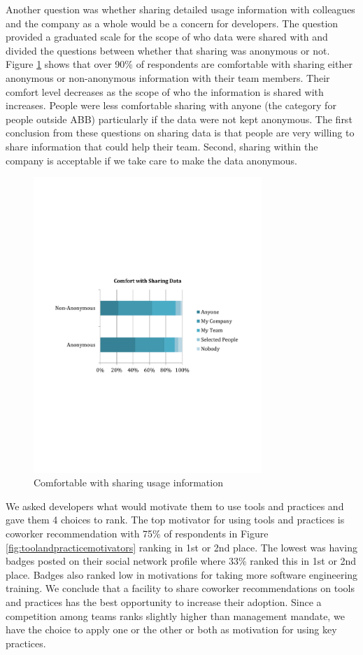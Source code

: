 \documentclass{sig-alternate}
\begin{document}
Another question was whether sharing detailed usage information with colleagues and the company as a whole would be a concern for developers.  The question provided a graduated scale for the scope of who data were shared with and divided the questions between whether that sharing was anonymous or not. Figure \ref{fig:comfortwithsharing}  shows that over 90\% of respondents are comfortable with sharing either anonymous or non-anonymous information with their team members. 
Their comfort level decreases as the scope of who the information is shared with increases.  People were less comfortable sharing with anyone (the category for people outside ABB) particularly if the data were not kept anonymous.  
The first conclusion from these questions on sharing data is that people are very willing to share information that could help their team. Second, sharing within the company is acceptable if we take care to make the data anonymous.

\begin{figure}
	\includegraphics[width=3.4in]{ComfortWithSharing.pdf}
	\caption{Comfortable with sharing usage information}
	\label{fig:comfortwithsharing}
\end{figure}

We asked developers what would motivate them to use tools and practices and gave them 4 choices to rank.  The top motivator for using tools and practices is coworker recommendation with 75\% of respondents in Figure \ref{fig:toolandpracticemotivators}   ranking in 1st or 2nd place. The lowest was having badges posted on their social network profile where 33\% ranked this in 1st or 2nd place.   Badges also ranked low in motivations for taking more software engineering training.  We conclude that a facility to share coworker recommendations on tools and practices has the best opportunity to increase their adoption.  Since a competition among teams ranks slightly higher than management mandate, we have the choice to apply one or the other or both as motivation for using key practices.  
 
\end{document}
